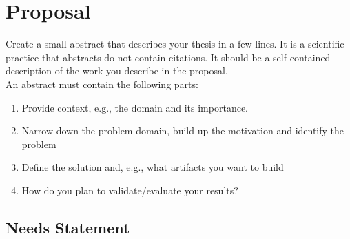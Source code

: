 
\newcommand{\authorname}{}

\newcommand{\worktype}{Research Proposal}
\newcommand{\proposalTitle}{Proposal Title}

\newcommand{\supervisor}{Paul Schmiedmayer, PhD}
\newcommand{\advisors}{}

\newcommand{\submissionDate}{\today}



 





\frontmatter




\mainmatter

\chapter*{Proposal}

\begin{tcolorbox}[breakable]
	Create a small abstract that describes your thesis in a few lines.
	It is a scientific practice that abstracts do not contain citations.
	It should be a self-contained description of the work you describe in the proposal.
	\\
	An abstract must contain the following parts:
	\begin{enumerate}
		\item Provide context, e.g., the domain and its importance.
		\item Narrow down the problem domain, build up the motivation and identify the problem
		\item Define the solution and, e.g., what artifacts you want to build
		\item How do you plan to validate/evaluate your results?
	\end{enumerate}
\end{tcolorbox}

\section*{Needs Statement}

